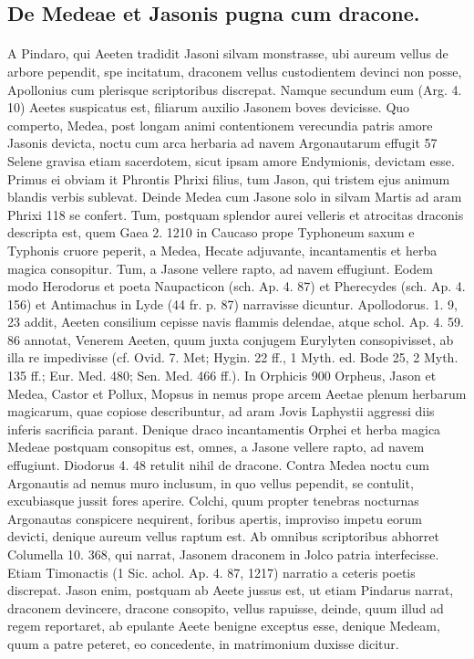 \documentclass[a4paper, 11pt, oneside, polutonikogreek, german]{article}
\begin{document}
\subsection{De Medeae et Jasonis pugna cum dracone.}
\paragraph{}
A Pindaro, qui Aeeten tradidit Jasoni silvam monstrasse, ubi aureum vellus de arbore pependit, spe incitatum, draconem vellus custodientem devinci non posse, Apollonius cum plerisque scriptoribus discrepat. Namque secundum eum (Arg. 4. 10) Aeetes suspicatus est, filiarum auxilio Jasonem boves devicisse. Quo comperto, Medea, post longam animi contentionem verecundia patris amore Jasonis devicta, noctu cum arca herbaria ad navem Argonautarum effugit 57 Selene gravisa etiam sacerdotem, sicut ipsam amore Endymionis, devictam esse. Primus ei obviam it Phrontis Phrixi filius, tum Jason, qui tristem ejus animum blandis verbis sublevat. Deinde Medea cum Jasone solo in silvam Martis ad aram Phrixi 118 se confert. Tum, postquam splendor aurei velleris et atrocitas draconis descripta est, quem Gaea 2. 1210 in Caucaso prope Typhoneum saxum e Typhonis cruore peperit, a Medea, Hecate adjuvante, incantamentis et herba magica consopitur. Tum, a Jasone vellere rapto, ad navem effugiunt. Eodem modo Herodorus et poeta Naupacticon (sch. Ap. 4. 87) et Pherecydes (sch. Ap. 4. 156) et Antimachus in Lyde (44 fr. p. 87) narravisse dicuntur. Apollodorus. 1. 9, 23 addit, Aeeten consilium cepisse navis flammis delendae, atque schol. Ap. 4. 59. 86 annotat, Venerem Aeeten, quum juxta conjugem Eurylyten consopivisset, ab illa re impedivisse (cf. Ovid. 7. Met; Hygin. 22 ff., 1 Myth. ed. Bode 25, 2 Myth. 135 ff.; Eur. Med. 480; Sen. Med. 466 ff.). In Orphicis 900 Orpheus, Jason et Medea, Castor et Pollux, Mopsus in nemus prope arcem Aeetae plenum herbarum magicarum, quae copiose describuntur, ad aram Jovis Laphystii aggressi diis inferis sacrificia parant. Denique draco incantamentis Orphei et herba magica Medeae postquam consopitus est, omnes, a Jasone vellere rapto, ad navem effugiunt. Diodorus 4. 48 retulit nihil de dracone. Contra Medea noctu cum Argonautis ad nemus muro inclusum, in quo vellus pependit, se contulit, excubiasque jussit fores aperire. Colchi, quum propter tenebras nocturnas Argonautas conspicere nequirent, foribus apertis, improviso impetu eorum devicti, denique aureum vellus raptum est. Ab omnibus scriptoribus abhorret Columella 10. 368, qui narrat, Jasonem draconem in Jolco patria interfecisse. Etiam Timonactis (1 Sic. achol. Ap. 4. 87, 1217) narratio a ceteris poetis discrepat. Jason enim, postquam ab Aeete jussus est, ut etiam Pindarus narrat, draconem devincere, dracone consopito, vellus rapuisse, deinde, quum illud ad regem reportaret, ab epulante Aeete benigne exceptus esse, denique Medeam, quum a patre peteret, eo concedente, in matrimonium duxisse dicitur.
\end{document}
